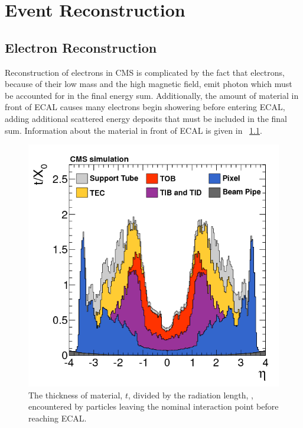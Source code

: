 \chapter{Event Reconstruction}
\label{reconstruction_chapter}

\section{Electron Reconstruction}
\label{sec:electron_reconstruction}

Reconstruction of electrons in CMS is complicated by the fact that electrons,
because of their low mass and the high magnetic field, emit photon which must
be accounted for in the final energy sum. Additionally, the amount of material
in front of ECAL causes many electrons begin showering before entering ECAL,
adding additional scattered energy deposits that must be included in the final
sum. Information about the material in front of ECAL is given in
\FIG~\ref{fig:tracker_material}\cite{cms_tracker_2014}.

\begin{figure}[!htbp]
    \centering
    \includegraphics[width=\textwidth]{figures/tracker_material_budget.png}
    \caption{
        The thickness of material, $t$, divided by the radiation length,
        \radiationlength, encountered by particles leaving the nominal
        interaction point before reaching ECAL.
    }
    \label{fig:tracker_material}
\end{figure}

